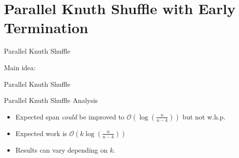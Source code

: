 \section{Parallel Knuth Shuffle with Early Termination}

\begin{frame}{Parallel Knuth Shuffle}
  \begin{center}
    \Large{Main idea: }
  \end{center}
\end{frame}

\begin{frame}{Parallel Knuth Shuffle}
  \begin{algorithm}[H]
  \caption{Parallel Knuth Shuffle}
  \begin{algorithmic}
  \end{algorithmic}
  \end{algorithm}
\end{frame}

\begin{frame}{Parallel Knuth Shuffle Analysis}
  \begin{itemize}
    \item Expected span \textit{could} be improved to 
      \(\mathcal{O}\left(\log\left(\frac{n}{n-k}\right)\right)\) but not w.h.p.
    \item Expected work is \(\mathcal{O}\left( k \log\left(\frac{n}{n-k}\right) 
      \right)\)
    \item Results can vary depending on \(k\).
  \end{itemize}
\end{frame}

